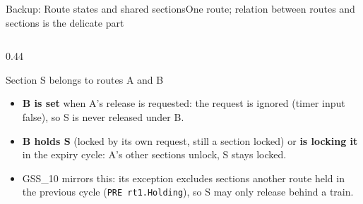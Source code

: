 \documentclass[aspectratio=169,10pt]{beamer}
\newcommand{\smallfont}{\fontsize{7}{8.6}\selectfont}
\begin{document}
\begin{frame}{Backup: Route states and shared sections}{One route; relation between routes and sections is the delicate part}
\begin{columns}[T,onlytextwidth]
    \begin{column}{0.44\textwidth}
      \begin{proverbox}{Section S belongs to routes A and B}
        \begin{itemize}\setlength{\itemsep}{1.8pt}\smallfont
          \item \textbf{B is set} when A's release is requested: the request is ignored (timer input false), so S is never released under B.
          \item \textbf{B holds S} (locked by its own request, still a section locked) or \textbf{is locking it} in the expiry cycle: A's other sections unlock, S stays locked.
          \item GSS\_10 mirrors this: its exception excludes sections another route held in the previous cycle (\texttt{PRE rt1.Holding}), so S may only release behind a train.
        \end{itemize}
      \end{proverbox}
    \end{column}
  \end{columns}
\end{frame}
\end{document}
